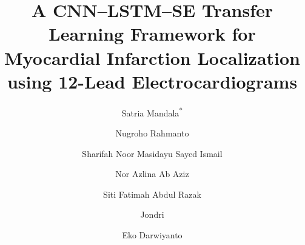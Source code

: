 \documentclass[preprint,12pt]{elsarticle}
\begin{document}
\begin{frontmatter}



\title{A CNN–LSTM–SE Transfer Learning Framework for Myocardial Infarction Localization using 12-Lead Electrocardiograms}


\author[aff1,aff2]{Satria Mandala\textsuperscript{*}}
\author[aff1]{Nugroho Rahmanto}
\author[aff3,aff5]{Sharifah Noor Masidayu Sayed Ismail}
\author[aff4,aff6]{Nor Azlina Ab Aziz}
\author[aff3,aff5]{Siti Fatimah Abdul Razak}
\author[aff1]{Jondri}
\author[aff1]{Eko Darwiyanto}





\end{frontmatter}
\end{document}
